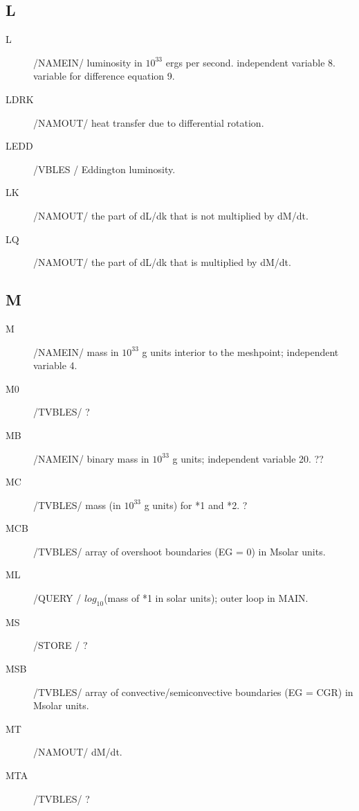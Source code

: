 \documentclass{article}
\begin{document}
\subsection*{L}
\begin{description}
	\item[L]		    /NAMEIN/ luminosity in $10^{33}$ ergs per second.
			        independent variable 8.  variable for difference equation 9.
			        
	\item[LDRK]		/NAMOUT/ heat transfer due to differential rotation.

	\item[LEDD]		/VBLES / Eddington luminosity.

	\item[LK]      	/NAMOUT/ the part of dL/dk that is not multiplied by dM/dt.

	\item[LQ]      	/NAMOUT/ the part of dL/dk that is multiplied by dM/dt.

\end{description}
\subsection*{M}
\begin{description}
	\item[M]		    /NAMEIN/ mass in $10^{33}$ g units interior to the meshpoint; independent variable 4.

	\item[M0]      	/TVBLES/ ?
	
	\item[MB]      	/NAMEIN/ binary mass in $10^{33}$ g units; independent variable 20.  ??

	\item[MC]      	/TVBLES/ mass (in $10^{33}$ g units) for *1 and *2.  ?

	\item[MCB]		    /TVBLES/ array of overshoot boundaries (EG = 0) in Msolar units.

	\item[ML]		    /QUERY / $log_{10}$(mass of *1 in solar units); outer loop in MAIN.

	\item[MS]		    /STORE / ?
	
	\item[MSB]     	/TVBLES/ array of convective/semiconvective boundaries (EG = CGR) in Msolar units.

	\item[MT]      	/NAMOUT/ dM/dt.

	\item[MTA]     	/TVBLES/ ?
	
\end{description}
\end{document}
